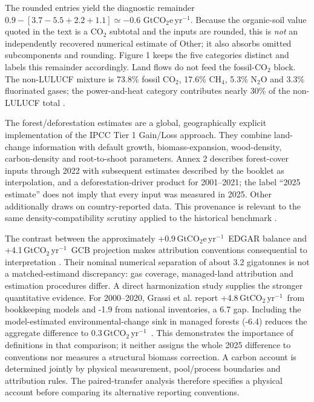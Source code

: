 \documentclass[11pt,a4paper]{article}
\newcommand{\COtwo}{\ensuremath{\mathrm{CO}_2}}
\newcommand{\COtwoe}{\ensuremath{\mathrm{CO}_2\mathrm{e}}}
\theoremstyle{remark}
\begin{document}
The rounded entries yield the diagnostic remainder $0.9-[3.7-5.5+2.2+1.1]\simeq-0.6$ Gt\COtwoe{}\,yr$^{-1}$. Because the organic-soil value quoted in the text is a \COtwo{} subtotal and the inputs are rounded, this is \emph{not} an independently recovered numerical estimate of Other; it also absorbs omitted subcomponents and rounding. Figure 1 keeps the five categories distinct and labels this remainder accordingly. Land flows do not feed the fossil-\COtwo{} block. The non-LULUCF mixture is 73.8\% fossil \COtwo{}, 17.6\% CH$_4$, 5.3\% N$_2$O and 3.3\% fluorinated gases; the power-and-heat category contributes nearly 30\% of the non-LULUCF total \citep{Crippa2026}.

The forest/deforestation estimates are a global, geographically explicit implementation of the IPCC Tier 1 Gain/Loss approach. They combine land-change information with default growth, biomass-expansion, wood-density, carbon-density and root-to-shoot parameters. Annex 2 describes forest-cover inputs through 2022 with subsequent estimates described by the booklet as interpolation, and a deforestation-driver product for 2001--2021; the label ``2025 estimate'' does not imply that every input was measured in 2025. Other additionally draws on country-reported data. This provenance is relevant to the same density-compatibility scrutiny applied to the historical benchmark \citep{Crippa2026}.

The contrast between the approximately +0.9\,Gt\COtwoe{}\,yr$^{-1}$\ EDGAR balance and +4.1\,Gt\COtwo{}\,yr$^{-1}$\ GCB projection makes attribution conventions consequential to interpretation \citep{Crippa2026,Friedlingstein2026}. Their nominal numerical separation of about 3.2 gigatonnes is not a matched-estimand discrepancy: gas coverage, managed-land attribution and estimation procedures differ. A direct harmonization study supplies the stronger quantitative evidence. For 2000--2020, Grassi et al. report +4.8\,Gt\COtwo{}\,yr$^{-1}$\ from bookkeeping models and -1.9 from national inventories, a 6.7 gap. Including the model-estimated environmental-change sink in managed forests (-6.4) reduces the aggregate difference to 0.3\,Gt\COtwo{}\,yr$^{-1}$\ \citep{Grassi2023}. This demonstrates the importance of definitions in that comparison; it neither assigns the whole 2025 difference to conventions nor measures a structural biomass correction. A carbon account is determined jointly by physical measurement, pool/process boundaries and attribution rules. The paired-transfer analysis therefore specifies a physical account before comparing its alternative reporting conventions.
\end{document}
